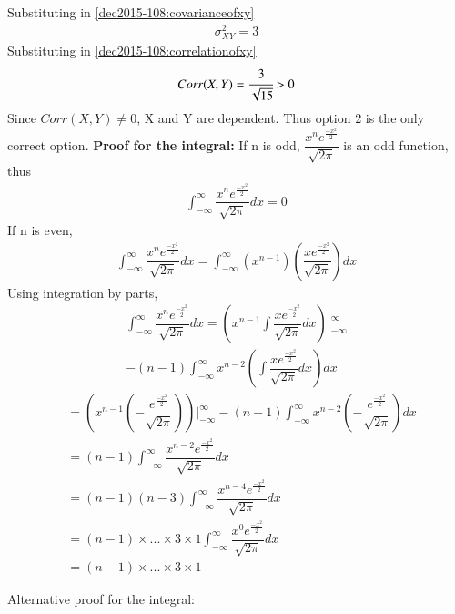 Substituting in \eqref{dec2015-108:covarianceofxy}
\begin{align}
    \sigma_{XY}^2 = 3
\end{align}
Substituting in \eqref{dec2015-108:correlationofxy}
\begin{align}
    Corr(X,Y) = \cfrac{3}{\sqrt{15}} > 0
\end{align}
Since $Corr(X,Y) \ne 0$, X and Y are dependent. Thus option 2 is the only correct option.
\textbf{Proof for the integral:}
If n is odd, $\dfrac{x^n e^{\frac{-x^2}{2}}}{\sqrt{2\pi}}$ is an odd function, thus
\begin{align}
    \int_{-\infty}^{\infty} \dfrac{x^n e^{\frac{-x^2}{2}}}{\sqrt{2\pi}}dx = 0
\end{align}
If n is even, 
\begin{align}
    \int_{-\infty}^{\infty} \dfrac{x^n e^{\frac{-x^2}{2}}}{\sqrt{2\pi}}dx = \int_{-\infty}^{\infty} (x^{n-1}) (\dfrac{x e^{\frac{-x^2}{2}}}{\sqrt{2\pi}})dx
\end{align}
Using integration by parts,
\begin{multline}
    \int_{-\infty}^{\infty} \dfrac{x^n e^{\frac{-x^2}{2}}}{\sqrt{2\pi}}dx = \left(x^{n-1}\int \dfrac{x e^{\frac{-x^2}{2}}}{\sqrt{2\pi}}dx\right)\biggr \vert_{-\infty}^{\infty}\\
       - (n-1)\int_{-\infty}^{\infty}x^{n-2}\left(\int \dfrac{x e^{\frac{-x^2}{2}}}{\sqrt{2\pi}}dx\right) dx
\end{multline}
\begin{align}
    &= \left(x^{n-1}(-\dfrac{e^{\frac{-x^2}{2}}}{\sqrt{2\pi}})\right)\biggr \vert_{-\infty}^{\infty}
           - (n-1)\int_{-\infty}^{\infty}x^{n-2}(-\dfrac{e^{\frac{-x^2}{2}}}{\sqrt{2\pi}}) dx\\
    &= (n-1)\int_{-\infty}^{\infty} \dfrac{x^{n-2} e^{\frac{-x^2}{2}}}{\sqrt{2\pi}}dx\\
    &= (n-1)(n-3)\int_{-\infty}^{\infty} \dfrac{x^{n-4} e^{\frac{-x^2}{2}}}{\sqrt{2\pi}}dx\\
    &= (n-1)\times...\times3\times1\int_{-\infty}^{\infty} \dfrac{x^0 e^{\frac{-x^2}{2}}}{\sqrt{2\pi}}dx\\
    &= (n-1)\times...\times3\times1
\end{align}

Alternative proof for the integral:

